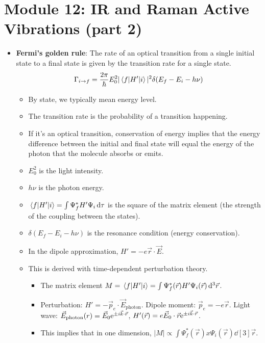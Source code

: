 \documentclass[../notes.tex]{subfiles}
\begin{document}
\section{Module 12: IR and Raman Active Vibrations (part 2)}
\begin{itemize}
    \item \textbf{Fermi's golden rule}: The rate of an optical transition from a single initial state to a final state is given by the transition rate for a single state.
    \begin{equation*}
        \Gamma_{i\to f} = \frac{2\pi}{\hbar}E_0^2|\mel{f}{H'}{i}|^2\delta(E_f-E_i-h\nu)
    \end{equation*}
    \begin{itemize}
        \item By state, we typically mean energy level.
        \item The transition rate is the probability of a transition happening.
        \item If it's an optical transition, conservation of energy implies that the energy difference between the initial and final state will equal the energy of the photon that the molecule absorbs or emits.
        \item $E_0^2$ is the light intensity.
        \item $h\nu$ is the photon energy.
        \item $\mel{f}{H'}{i}=\int\Psi_f^*H'\Psi_i\dd{\tau}$ is the square of the matrix element (the strength of the coupling between the states).
        \item $\delta(E_f-E_i-h\nu)$ is the resonance condition (energy conservation).
        \item In the dipole approximation, $H'=-e\vec{r}\cdot\vec{E}$.
        \item This is derived with time-dependent perturbation theory.
        \begin{itemize}
            \item The matrix element $M=\mel{f}{H'}{i}=\int\Psi_f^*(\vec{r})H'\Psi_i(\vec{r})\dd[3]{\vec{r}}$.
            \item Perturbation: $H'=-\vec{p}_e\cdot\vec{E}_\text{photon}$. Dipole moment: $\vec{p}_e=-e\vec{r}$. Light wave: $\vec{E}_\text{photon}(r)=\vec{E}_0\e[\pm i\vec{k}\cdot\vec{r}]$, $H'(\vec{r})=e\vec{E}_0\cdot\vec{r}\e[\pm i\vec{k}\cdot\vec{r}]$.
            \item This implies that in one dimension, $|M|\propto\int\Psi_f^*(\vec{r})x\Psi_i(\vec{r})\dd[3]{\vec{r}}$.

\end{itemize}
\end{itemize}
\end{itemize}
\end{document}
